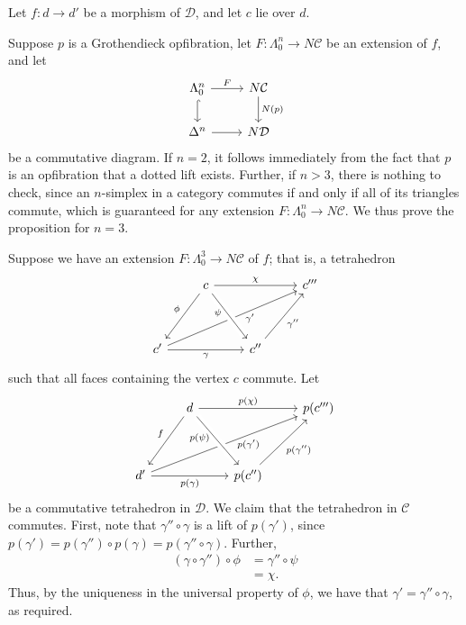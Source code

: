 \documentclass{MetricNotes2023}
\begin{document}
\begin{ourproof}
Let \(f : d \to d'\) be a morphism of \(\mathcal{D}\), and let \(c\) lie over \(d\). 

Suppose \(p\) is a Grothendieck opfibration, let \(F : \Lambda^n_0 \to N \mathcal{C}\) be an extension of \(f\), and let 
\[\begin{tikzcd}
\Lambda^n_0 \arrow[r, "F"] \arrow[d, hookrightarrow, swap, ""]  & N\mathcal{C} \arrow[d, "N(p)"]  \\
\Delta^n \arrow[r, swap, ""]  & N\mathcal{D}
\end{tikzcd}\]
be a commutative diagram. If \(n=2\), it follows immediately from the fact that \(p\) is an opfibration that a dotted lift exists. Further, if \(n>3\), there is nothing to check, since an \(n\)-simplex in a category commutes if and only if all of its triangles commute, which is guaranteed for any extension \(F : \Lambda^n_0 \to N \mathcal{C}\). We thus prove the proposition for \(n=3\).

Suppose we have an extension \(F : \Lambda^3_0 \to N \mathcal{C}\) of \(f\); that is, a tetrahedron 
\[\begin{tikzcd}
& c \arrow[rr, "\chi"] \arrow[ddl, swap, "\phi"]  & & c''' \\
& & & \\
c' \arrow[rr, swap, "\gamma"] \arrow[rrruu, swap, "\gamma'" {xshift=8pt, yshift=6pt}] & & c'' \arrow[ruu, swap, "\gamma''"] \arrow[from=luu, swap, crossing over, "\psi" {xshift=-4pt, yshift=8pt}] & 
\end{tikzcd}\]
such that all faces containing the vertex \(c\) commute. Let
\[\begin{tikzcd}
& d \arrow[rr, "p(\chi)"] \arrow[ddl, swap, "f"]  & & p(c''') \\
& & & \\
d' \arrow[rr, swap, "p(\gamma)"] \arrow[rrruu, swap, "p(\gamma')" {xshift=8pt, yshift=6pt}] & & p(c'') \arrow[ruu, swap, "p(\gamma'')"] \arrow[from=luu, swap, crossing over, "p(\psi)" {xshift=-4pt, yshift=8pt}] & 
\end{tikzcd}\]
be a commutative tetrahedron in \(\mathcal{D}\). We claim that the tetrahedron in \(\mathcal{C}\) commutes. First, note that \(\gamma'' \circ \gamma\) is a lift of \(p(\gamma')\), since \(p(\gamma')=p(\gamma'')\circ p(\gamma)=p(\gamma'' \circ \gamma)\). Further,
\begin{align*}
(\gamma \circ \gamma'') \circ \phi&=\gamma'' \circ \psi\\
&= \chi.
\end{align*}
Thus, by the uniqueness in the universal property of \(\phi\), we have that \(\gamma'=\gamma'' \circ \gamma\), as required.


\end{ourproof}
\end{document}
